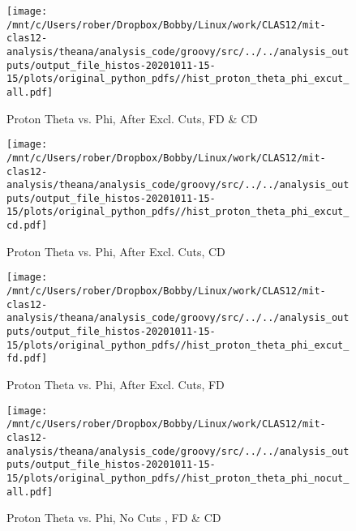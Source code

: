 \documentclass{article}
\begin{document}
\begin{landscape}
    \begin{figure}[h]
        \centering

        \texttt{[image: /mnt/c/Users/rober/Dropbox/Bobby/Linux/work/CLAS12/mit-clas12-analysis/theana/analysis\_code/groovy/src/../../analysis\_outputs/output\_file\_histos-20201011-15-15/plots/original\_python\_pdfs//hist\_proton\_theta\_phi\_excut\_all.pdf]}
        \captionsetup{textformat=empty,labelformat=blank}
        \caption{Proton Theta vs. Phi, After Excl. Cuts, FD \& CD}
    \end{figure}
    \clearpage
    
    \begin{figure}[h]
        \centering

        \texttt{[image: /mnt/c/Users/rober/Dropbox/Bobby/Linux/work/CLAS12/mit-clas12-analysis/theana/analysis\_code/groovy/src/../../analysis\_outputs/output\_file\_histos-20201011-15-15/plots/original\_python\_pdfs//hist\_proton\_theta\_phi\_excut\_cd.pdf]}
        \captionsetup{textformat=empty,labelformat=blank}
        \caption{Proton Theta vs. Phi, After Excl. Cuts, CD}
    \end{figure}
    \clearpage
    
    \begin{figure}[h]
        \centering

        \texttt{[image: /mnt/c/Users/rober/Dropbox/Bobby/Linux/work/CLAS12/mit-clas12-analysis/theana/analysis\_code/groovy/src/../../analysis\_outputs/output\_file\_histos-20201011-15-15/plots/original\_python\_pdfs//hist\_proton\_theta\_phi\_excut\_fd.pdf]}
        \captionsetup{textformat=empty,labelformat=blank}
        \caption{Proton Theta vs. Phi, After Excl. Cuts, FD}
    \end{figure}
    \clearpage
    
    \begin{figure}[h]
        \centering

        \texttt{[image: /mnt/c/Users/rober/Dropbox/Bobby/Linux/work/CLAS12/mit-clas12-analysis/theana/analysis\_code/groovy/src/../../analysis\_outputs/output\_file\_histos-20201011-15-15/plots/original\_python\_pdfs//hist\_proton\_theta\_phi\_nocut\_all.pdf]}
        \captionsetup{textformat=empty,labelformat=blank}
        \caption{Proton Theta vs. Phi, No Cuts , FD \& CD}
    \end{figure}
    \clearpage
    
    \begin{figure}[h]
        \centering


\end{figure}
\end{landscape}
\end{document}
